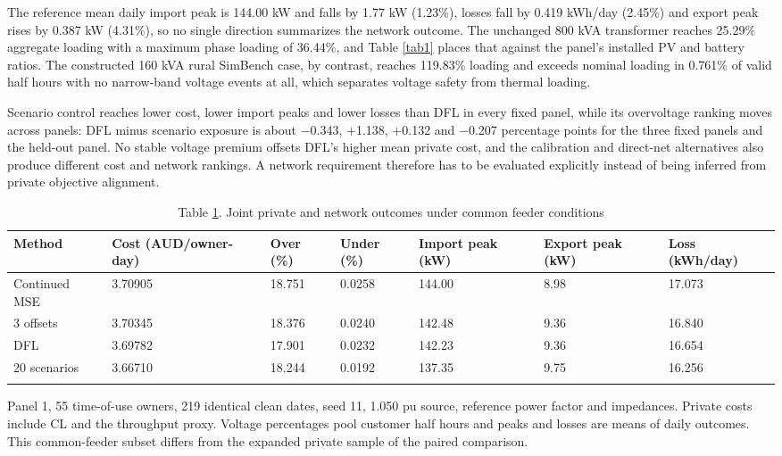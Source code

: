 \documentclass[pdflatex,Numbered,sn-basic]{sn-jnl}
\begin{document}
The reference mean daily import peak is 144.00 kW and falls by 1.77 kW (1.23\%), losses fall by 0.419 kWh/day (2.45\%) and export peak rises by 0.387 kW (4.31\%), so no single direction summarizes the network outcome. The unchanged 800 kVA transformer reaches 25.29\% aggregate loading with a maximum phase loading of 36.44\%, and Table \ref{tab1} places that against the panel's installed PV and battery ratios. The constructed 160 kVA rural SimBench case, by contrast, reaches 119.83\% loading and exceeds nominal loading in 0.761\% of valid half hours with no narrow-band voltage events at all, which separates voltage safety from thermal loading.

Scenario control reaches lower cost, lower import peaks and lower losses than DFL in every fixed panel, while its overvoltage ranking moves across panels: DFL minus scenario exposure is about $-$0.343, +1.138, +0.132 and $-$0.207 percentage points for the three fixed panels and the held-out panel. No stable voltage premium offsets DFL's higher mean private cost, and the calibration and direct-net alternatives also produce different cost and network rankings. A network requirement therefore has to be evaluated explicitly instead of being inferred from private objective alignment.

\begin{table}[htbp]
\centering
\caption{Table \ref{tab4}. Joint private and network outcomes under common feeder conditions}
\label{tab4}
\small
\setlength{\tabcolsep}{3pt}
\begin{tabular}{@{}p{62pt}p{54pt}p{44pt}p{44pt}p{56pt}p{50pt}p{58pt}@{}}
\toprule
\textbf{Method} & \textbf{Cost (AUD/owner-day)} & \textbf{Over (\%)} & \textbf{Under (\%)} & \textbf{Import peak (kW)} & \textbf{Export peak (kW)} & \textbf{Loss (kWh/day)} \\
\midrule
Continued MSE & 3.70905 & 18.751 & 0.0258 & 144.00 & 8.98 & 17.073 \\
3 offsets & 3.70345 & 18.376 & 0.0240 & 142.48 & 9.36 & 16.840 \\
DFL & 3.69782 & 17.901 & 0.0232 & 142.23 & 9.36 & 16.654 \\
20 scenarios & 3.66710 & 18.244 & 0.0192 & 137.35 & 9.75 & 16.256 \\
\botrule
\end{tabular}
\par\vspace{2pt}
\footnotesize Panel 1, 55 time-of-use owners, 219 identical clean dates, seed 11, 1.050 pu source, reference power factor and impedances. Private costs include CL and the throughput proxy. Voltage percentages pool customer half hours and peaks and losses are means of daily outcomes. This common-feeder subset differs from the expanded private sample of the paired comparison.
\end{table}
\end{document}
